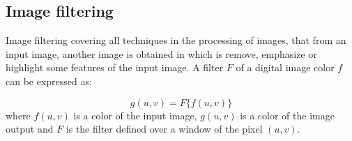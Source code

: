 

	




\subsection{Image filtering}
Image filtering covering all techniques in the processing of images, that from an input image, another image is obtained in which is remove, emphasize or highlight some features of the input image. 
A filter $F$ of a digital image color $f$ can be expressed as:

\begin{equation}
\label{Filtrado} 
      g(u,v) = F\{f(u,v)\}
\end{equation}
where $f(u,v)$ is a color of the input image, $g(u,v)$ is a color of the image output and $F$ is the filter defined over a window of the pixel $(u,v)$.


